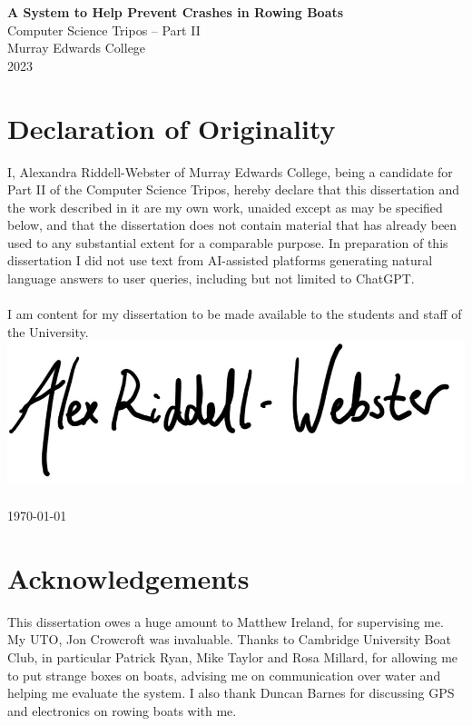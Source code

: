 \documentclass[12pt,a4paper]{report}
\begin{document}
\thispagestyle{empty}


\vspace*{60mm}
\begin{center}
\Huge
\textbf{A System to Help Prevent Crashes in Rowing Boats} \\[5mm]
Computer Science Tripos -- Part II \\[5mm]
Murray Edwards College \\[5mm]
2023
\end{center}

\pagestyle{plain}
\chapter*{Declaration of Originality}

I, Alexandra Riddell-Webster of Murray Edwards College, being a candidate for Part II of the Computer Science Tripos, hereby declare that this dissertation and the work described in it are my own work, unaided except as may be specified below, and that the dissertation does not contain material that has already been used to any substantial extent for a comparable purpose. In preparation of this dissertation I did not use text from AI-assisted platforms generating natural language answers to user queries, including but not limited to ChatGPT.\\ \\
I am content for my dissertation to be made available to the students and staff of the University. \\

\bigskip
{}
\includegraphics[scale=0.35]{sig.jpg} \\
 \\ 
\today

\chapter*{Acknowledgements}
This dissertation owes a huge amount to Matthew Ireland, for supervising me. My UTO, Jon Crowcroft was invaluable. Thanks to Cambridge University Boat Club, in particular Patrick Ryan, Mike Taylor and Rosa Millard, for allowing me to put strange boxes on boats, advising me on communication over water and helping me evaluate the system. I also thank Duncan Barnes for discussing GPS and electronics on rowing boats with me.
\end{document}
